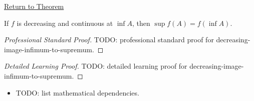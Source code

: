 \newpage
{}
\label{prf:decreasing-image-infimum-to-supremum}

\begin{remark*}[Return]
\hyperref[thm:decreasing-image-infimum-to-supremum]{Return to Theorem}
\end{remark*}

\begin{theorem*}
If $f$ is decreasing and continuous at $\inf A$, then
$\sup f(A)=f(\inf A)$.
\end{theorem*}

\begin{proof}[Professional Standard Proof]
\LRAProofBodyStart
TODO: professional standard proof for decreasing-image-infimum-to-supremum.
\end{proof}

\begin{proof}[Detailed Learning Proof]
\LRAProofBodyStart
TODO: detailed learning proof for decreasing-image-infimum-to-supremum.
\end{proof}

\begin{remark*}
\end{remark*}

\begin{dependencies}
\begin{itemize}
  \item TODO: list mathematical dependencies.
\end{itemize}
\end{dependencies}

\clearpage

